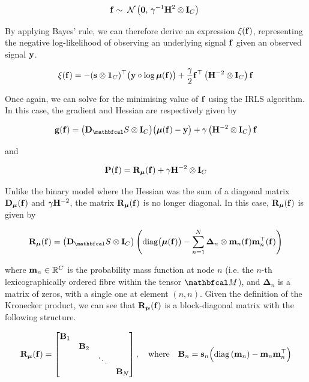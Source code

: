 \begin{equation}
    \label{eq:f_prior_mc_lgsr}
    \mathbf{f} \sim \; \mathcal{N}\left(\mathbf{0}, \, \gamma^{-1} \mathbf{H}^2 \otimes \mathbf{I}_C\right) \;
\end{equation}

By applying Bayes' rule, we can therefore derive an expression $\xi(\mathbf{f})$, representing the negative log-likelihood of observing an underlying signal $\mathbf{f}$ given an observed signal $\mathbf{y}$. 

\begin{equation}
    \xi(\mathbf{f}) = - (\mathbf{s} \otimes \mathbf{1}_C)^\top \big(\mathbf{y} \circ \log \boldsymbol{\mu}(\mathbf{f}) \big) + \frac{\gamma}{2} \mathbf{f}^\top \left(\mathbf{H}^{-2} \otimes \mathbf{I}_C\right) \mathbf{f}
\end{equation}

Once again, we can solve for the minimising value of $\mathbf{f}$ using the IRLS algorithm. In this case, the gradient and Hessian are respectively given by 

\begin{equation}
    \g(\f) = \big(\D_\St \otimes \I_C\big) \big(\muu(\f) - \y\big) + \gamma \left(\HH^{-2} \otimes \I_C\right) \f
\end{equation}

and

\begin{equation}
    \mathbf{P}(\mathbf{f}) = \mathbf{R}_{\boldsymbol{\mu}}(\mathbf{f}) + \gamma \mathbf{H}^{-2} \otimes \mathbf{I}_C
\end{equation}

Unlike the binary model where the Hessian was the sum of a diagonal matrix $\mathbf{D}_{\boldsymbol{\mu}}(\mathbf{f})$ and $\gamma \mathbf{H}^{-2}$, the matrix $\mathbf{R}_{\boldsymbol{\mu}}(\mathbf{f})$ is no longer diagonal. In this case, $\mathbf{R}_{\boldsymbol{\mu}}(\mathbf{f})$ is given by 

\begin{equation}
    \RR_{\muu}(\f) =  \big(\D_\St \otimes \I_C\big) \left(\Diag{\muu(\f)} - \sum_{n=1}^N \mathbf{\Delta}_{n} \otimes \m_n (\f) \m_n^\top(\f) \right)
\end{equation}

where $\mathbf{m}_n \in \mathbb{R}^C$ is the probability mass function at node $n$ (i.e. the $n$-th lexicographically ordered fibre within the tensor $\Mt$), and $\mathbf{\Delta}_{n}$ is a matrix of zeros, with a single one at element $(n, n)$. Given the definition of the Kronecker product, we can see that $\mathbf{R}_{\boldsymbol{\mu}}(\mathbf{f})$ is a block-diagonal matrix with the following structure. 

\begin{equation*}
    \mathbf{R}_{\boldsymbol{\mu}}(\mathbf{f}) = \begin{bmatrix}
        \mathbf{B}_1 & & & \\
        & \mathbf{B}_2 & & \\
        & & \ddots & \\
        & & & \mathbf{B}_N
    \end{bmatrix}, \quad \text{where} \quad \mathbf{B}_n = \mathbf{s}_n \Big(\text{\textup{diag}}\left(\mathbf{m}_n\right) - \mathbf{m}_n \mathbf{m}_n^\top\Big)
\end{equation*}


